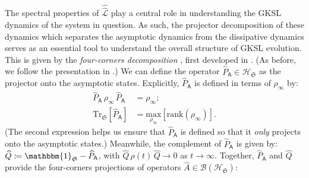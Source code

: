 \documentclass[preprints,article,accept,moreauthors,pdftex]{Definitions/mdpi}
\begin{document}
\begin{paracol}{2}
The spectral properties of $\hat{\hat{\mathcal{L}}}$ play a central role in understanding the GKSL dynamics of the system in question. As such, the projector decomposition of these dynamics which separates the asymptotic dynamics from the dissipative dynamics serves as an essential tool to understand the overall structure of GKSL evolution. This is given by the \emph{four-corners decomposition} %
, first developed in \cite{ABFJ16}. (As before, we follow the presentation in \cite{Albert18}.) %
We can define the operator $\widehat{P}_{\mathsf{A}} \in \mathcal{H}_{\mathfrak{S}}$ as the projector onto the asymptotic states. Explicitly, $\widehat{P}_{\mathsf{A}}$ is defined in terms of $\rho_{\infty}$ by:
\begin{equation}
    \label{eq:asymptotic-state-projector}
    \begin{split}
        \widehat{P}_{\mathsf{A}}\,\rho_{\infty}\,\widehat{P}_{\mathsf{A}} &= \rho_{\infty};\\[4pt]
        \mathrm{Tr}_{\mathfrak{S}}\left[\widehat{P}_{\mathsf{A}}\right] &= \underset{\rho_{\infty}}{\mathrm{max}}\left[\mathrm{rank}\left(\rho_{\infty}\right)\right].
    \end{split}
\end{equation}
(The second expression helps us ensure that $\widehat{P}_{\mathsf{A}}$ is defined so that it \emph{only} projects onto the asymptotic states.) Meanwhile, the complement of $\widehat{P}_{\mathsf{A}}$ is given by: $\widehat{Q} \coloneqq \mathbbm{1}_{\mathfrak{S}} - \widehat{P}_{\mathsf{A}}$, with $\widehat{Q}\,\rho\left(t\right)\,\widehat{Q}\rightarrow 0$ as $t \rightarrow \infty$. Together, $\widehat{P}_{\mathsf{A}}$ and $\widehat{Q}$ provide the four-corners projections of operators $\widehat{A}\in\mathcal{B}\left(\mathcal{H}_{\mathfrak{S}}\right)$:
\begin{equation}
    \label{eq:four-corners-decomp}
    \begin{split}

\end{split}
\end{equation}
\end{paracol}
\end{document}

